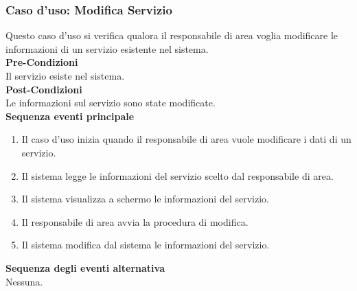 \documentclass[green, fancy, 11pt]{elegantbook}
\begin{document}
\subsubsection{Caso d'uso: Modifica Servizio}
\noindent
Questo caso d’uso si verifica qualora il responsabile di area voglia modificare le informazioni di un servizio esistente nel sistema.\\
\textbf{Pre-Condizioni}\\
Il servizio esiste nel sistema.\\
\textbf{Post-Condizioni}\\
Le informazioni sul servizio sono state modificate.\\
\textbf{Sequenza eventi principale}
\begin{enumerate}
	\item Il caso d’uso inizia quando il responsabile di area vuole modificare i dati di un servizio.
	\item Il sistema legge le informazioni del servizio scelto dal responsabile di area.
	\item Il sistema visualizza a schermo le informazioni del servizio.
	\item Il responsabile di area avvia la procedura di modifica.
	\item Il sistema modifica dal sistema le informazioni del servizio.
\end{enumerate}
\textbf{Sequenza degli eventi alternativa}\\
Nessuna.
\newpage
\end{document}
